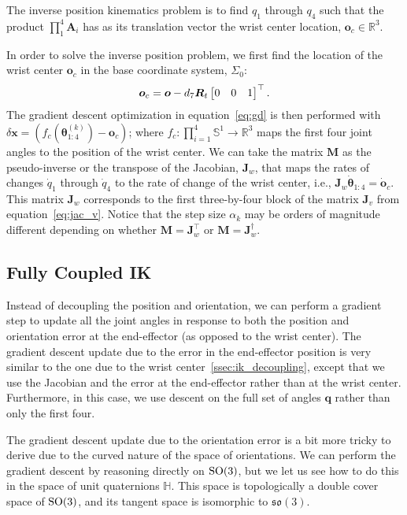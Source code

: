 The inverse position kinematics problem is to find $q_1$ through $q_4$ such
that the product $\prod_1^4 \bm{A}_i$ has as its translation vector the wrist
center location, $\bm{o}_c \in \mathbb{R}^3$.

In order to solve the inverse position problem, we first find the location of
the wrist center $\bm{o}_c$ in the base coordinate system,
$\Sigma_0$: \[ \bm{o}_c = \bm{o} - d_7 \bm{R}_t \begin{bmatrix}0 & 0 & 1\end{bmatrix}^\top. \]
%
The gradient descent optimization in equation~\eqref{eq:gd} is then performed 
with $\delta \bm{x} = \left(f_c\left(\bm{\theta}_{1:4}^{(k)}\right) - \bm{o}_c
\right)$; where $f_c: \prod_{i=1}^4 \mathbb{S}^1 \rightarrow \mathbb{R}^3$ maps
the first four joint angles to the position of the wrist center. We can take the
matrix $\bm{M}$ as the pseudo-inverse or the transpose of the Jacobian,
$\bm{J}_w$, that maps the rates of changes $\dot{q}_1$ through $\dot{q}_4$ to
the rate of change of the wrist center, i.e., $\bm{J}_w \dot{\bm{\theta}}_{1:4}
= \dot{\bm{o}}_c$. This matrix $\bm{J}_w$ corresponds to the first three-by-four
block of the matrix $\bm{J}_v$ from equation~\eqref{eq:jac_v}. 
%
Notice that the step size $\alpha_k$ may be orders of magnitude different
depending on whether $\bm{M} = \bm{J}_w^\top$ or $\bm{M} = \bm{J}_w^\dagger$. 


\subsection{Fully Coupled IK}
\label{ssec:ik_full}

Instead of decoupling the position and orientation, we can perform a gradient 
step to update all the joint angles in response to both the position and 
orientation error at the end-effector (as opposed to the wrist center). The 
gradient descent update due to the error in the end-effector position is very 
similar to the one due to the wrist center~\ref{ssec:ik_decoupling}, except that
we use the Jacobian and the error at the end-effector rather than at the wrist 
center. Furthermore, in this case, we use descent on the full set of angles
$\bm{q}$ rather than only the first four.

The gradient descent update due to the orientation error is a bit more tricky 
to derive due to the curved nature of the space of orientations. We can perform 
the gradient descent by reasoning directly on $\mathrm{SO}(3)$, but we let us see how
to do this in the space of unit quaternions $\mathbb{H}$. This space is 
topologically a double cover space of $\mathrm{SO}(3)$, and its tangent space is 
isomorphic to $\mathfrak{so}(3)$.

